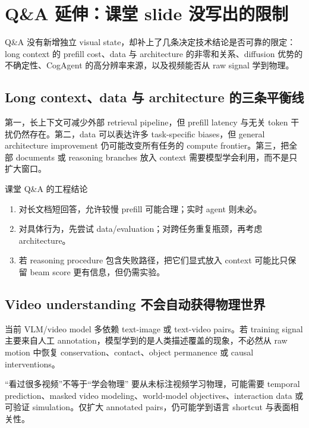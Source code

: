 \section{Q\&A 延伸：课堂 slide 没写出的限制}

Q\&A 没有新增独立 visual state，却补上了几条决定技术结论是否可靠的限定：long context 的 prefill cost、data 与 architecture 的非零和关系、diffusion 优势的不确定性、CogAgent 的高分辨率来源，以及视频能否从 raw signal 学到物理。

\subsection{Long context、data 与 architecture 的三条平衡线}

第一，长上下文可减少外部 retrieval pipeline，但 prefill latency 与无关 token 干扰仍然存在。第二，data 可以表达许多 task-specific biases，但 general architecture improvement 仍可能改变所有任务的 compute frontier。第三，把全部 documents 或 reasoning branches 放入 context 需要模型学会利用，而不是只扩大窗口。

\begin{importantbox}{课堂 Q\&A 的工程结论}
\begin{enumerate}
  \item 对长文档短回答，允许较慢 prefill 可能合理；实时 agent 则未必。
  \item 对具体行为，先尝试 data/evaluation；对跨任务重复瓶颈，再考虑 architecture。
  \item 若 reasoning procedure 包含失败路径，把它们显式放入 context 可能比只保留 beam score 更有信息，但仍需实验。
\end{enumerate}
\end{importantbox}


\subsection{Video understanding 不会自动获得物理世界}

当前 VLM/video model 多依赖 text-image 或 text-video pairs。若 training signal 主要来自人工 annotation，模型学到的是人类描述覆盖的现象，不必然从 raw motion 中恢复 conservation、contact、object permanence 或 causal interventions。

\begin{warningbox}{“看过很多视频”不等于“学会物理”}
要从未标注视频学习物理，可能需要 temporal prediction、masked video modeling、world-model objectives、interaction data 或可验证 simulation。仅扩大 annotated pairs，仍可能学到语言 shortcut 与表面相关性。
\end{warningbox}

